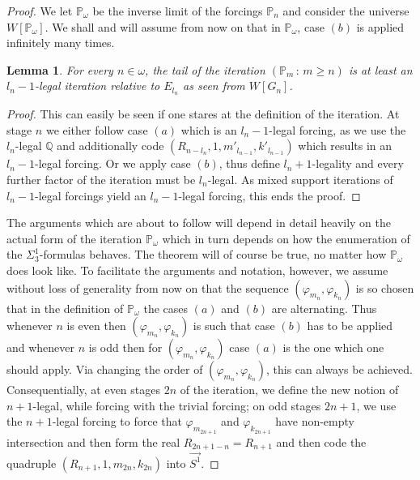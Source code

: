 \documentclass[a4paper,11pt]{article}
\newtheorem{lemma}[theorem]{Lemma}
\newcommand{\forceP}{\mathbb{P}}
\newcommand{\forceQ}{\mathbb{Q}}
\begin{document}
\begin{proof}
We let $\forceP_{\omega}$ be the inverse limit of the forcings $\forceP_n$ and consider the universe $W[\forceP_{\omega}]$.
We shall and will assume from now on that in $\forceP_{\omega}$, case $(b)$ is applied infinitely many times. 
\begin{lemma}
For every $n \in \omega$, the tail of the iteration $(\forceP_m \, :\, m \ge n)$ is at least an $l_n-1$-legal iteration relative to $E_{l_n}$ as seen from $W[G_n]$.
\end{lemma}
\begin{proof}
This can easily  be seen if one stares at the definition of the iteration. 
At stage $n$ we either follow case $(a)$ which is an $l_n -1$-legal forcing, as we use the $l_n$-legal $\forceQ$ and additionally code $(R_{{n-l_n}}, 1,m'_{l_{n-1}},k'_{l_{n-1}} )$ which results in an $l_n-1$-legal forcing. Or we apply case $(b)$, thus define $l_n+1$-legality and every further factor of the iteration must be $l_n$-legal. As mixed support iterations of $l_{n}-1$-legal forcings yield an $l_n -1$-legal forcing, this ends the proof.

\end{proof}

The arguments which are about to follow will depend in detail heavily on the actual form of the iteration $\forceP_{\omega}$ which in turn depends on how the enumeration of the $\Sigma^1_3$-formulas behaves. The theorem will of course be true, no matter how $\forceP_{\omega}$ does look like. To facilitate the arguments and notation, however, we assume without loss of generality from now on that the sequence $(\varphi_{m_n}, \varphi_{k_n})$ is so chosen that in the definition of $\forceP_{\omega}$ the cases $(a)$ and $(b)$ are alternating. Thus whenever $n$ is even then $(\varphi_{m_n}, \varphi_{k_n})$ is such that case $(b)$ has to be applied and whenever $n$ is odd then for $(\varphi_{m_n}, \varphi_{k_n})$ case $(a)$ is the one which one should apply. Via changing the order of $(\varphi_{m_n}, \varphi_{k_n})$, this can always be achieved. Consequentially, at even stages $2n$ of the iteration, we define the new notion of $n+1$-legal, while forcing with the trivial forcing; on odd stages $2n+1$, we use the $n+1$-legal forcing to force that $\varphi_{m_{2n+1}}$ and $\varphi_{k_{2n+1}}$ have non-empty intersection and then form the real $R_{2n+1 -n} =R_{n+1}$ and then  code the quadruple $(R_{n+1},1,m_{2n},k_{2n})$ into $\vec{S^1}$.


\end{proof}
\end{document}
